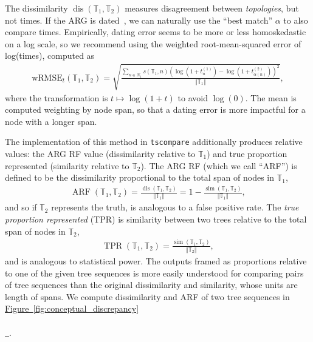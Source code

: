 \documentclass[10pt,twoside,lineno]{gsajnl}
\newcommand{\T}{\mathbb{T}}
\newcommand{\dis}{\operatorname{dis}}
\newcommand{\similarity}{\operatorname{sim}}
\newcommand*{\figref}[2][]{%
	\hyperref[{#2}]{%
		Figure~\ref*{#2}%
		\ifx\\#1\\%
		\else
		\,#1%
		\fi
	}%
}
\begin{document}
The dissimilarity $\dis(\T_1, \T_2)$ measures disagreement between \emph{topologies},
but not times.
If the ARG is dated~\citep{wohns2022unified}, 
we can naturally use the ``best match'' $\alpha$
to also compare times.
Empirically, dating error seems to be more or less homoskedastic on a log scale,
so we recommend 
using the weighted root-mean-squared error of log(times), computed as
\begin{align}\label{eqn:wrmse}
    \text{wRMSE}_t(\T_1, \T_2)
    = \sqrt{\frac{
        \sum_{n \in N_1} s(\T_1,n) \left(\log\left(1+ t^{(1)}_n\right) - \log\left(1+ t^{(2)}_{\alpha(n)}\right) \right)^2 
    }{
        \Vert{\T_1}\Vert
    } } ,
\end{align}
where the transformation is $t \mapsto \log(1 + t)$ to avoid $\log(0)$.
The mean is computed weighting by node span, so that a dating error
is more impactful for a node with a longer span. 

The implementation of this method in \texttt{tscompare}
additionally produces relative values:
the ARG RF value (dissimilarity relative to $\T_1$)
and true proportion represented (similarity relative to $\T_2$).
The ARG RF (which we call ``ARF'') is defined to be the dissimilarity proportional
 to the total span of nodes in $\T_1$,
 \begin{align}\label{eqn:dissimilarity}
 	\operatorname{ARF}(\T_1,\T_2)=\frac{\dis(\T_1,\T_2)}{\Vert \T_1 \Vert}
 	=1-\frac{\similarity(\T_1,\T_2)}{\Vert \T_1\Vert} ,
\end{align}
and so if $\T_2$ represents the truth, is analogous to a false positive rate.
The \emph{true proportion represented} (TPR) is similarity between two trees relative 
to the total span of nodes in $\T_2$,
\begin{align}\label{eqn:true-proportion}
	\operatorname{TPR}(\T_1,\T_2) = \frac{\similarity(\T_1,\T_2)}
	{\Vert \T_2\Vert} ,
\end{align}
and is analogous to statistical power.
The outputs framed as proportions relative to one of the given tree sequences is more easily understood
for comparing pairs of tree sequences than the original dissimilarity and similarity, whose units are length of spans.
We compute dissimilarity and ARF of two tree sequences in \figref{fig:conceptual_discrepancy}.
\end{document}
